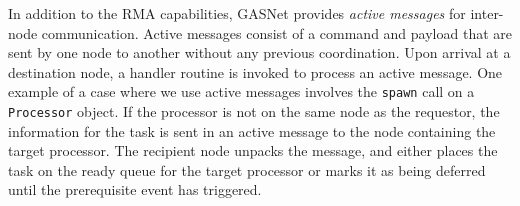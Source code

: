 In addition to the RMA capabilities, GASNet provides {\em active messages} for 
inter-node communication.  Active messages consist of a command and payload that
are sent by one node to another without any previous coordination.  Upon arrival
at a destination node, a handler routine is invoked to process an active message.
One example of a case where we use active messages involves the {\tt spawn} call on a {\tt Processor}
object.  If the processor is not on the same node as the requestor, the information
for the task is sent in an
active message to the node containing the target processor.  The recipient node
unpacks the message, and either places the task on the ready queue for the target
processor or marks it as being deferred until the prerequisite event has triggered.



